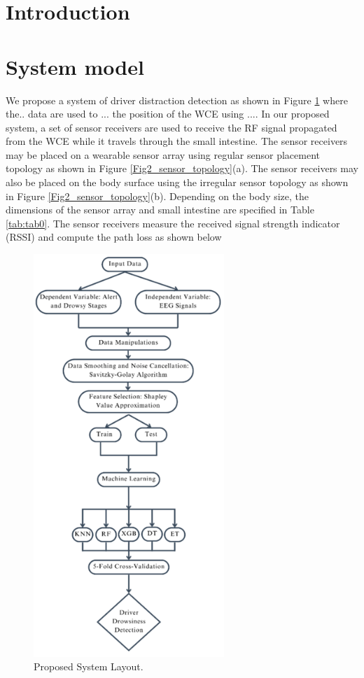 \documentclass{IEEE_lsens}
\begin{document}
\section{Introduction}
\vspace{-0.2cm}

\section{System model}
\vspace{-0.1cm}
We propose a system of driver distraction detection as shown in Figure \ref{Fig_system_layout} where the.. data are used to ... the position of the WCE using .... In our proposed system, a set of sensor receivers are used to receive the RF signal propagated from the WCE while it travels through the small intestine. The sensor receivers may be placed on a wearable sensor array using regular sensor placement topology as shown in Figure \ref{Fig2_sensor_topology}(a). The sensor receivers may also be placed on the body surface using the irregular sensor topology as shown in Figure \ref{Fig2_sensor_topology}(b). Depending on the body size, the dimensions of the sensor array and small intestine are specified in Table \ref{tab:tab0}. The sensor receivers measure the received signal strength indicator (RSSI) and compute the path loss as shown below
\begin{figure}[t!]
\centering
\includegraphics[width=7.2cm,keepaspectratio=true]{Fig_system_layout.png}
\vspace{-0.2cm}
\caption{\scriptsize Proposed System Layout.
\label{Fig_system_layout}}
\vspace{-0.3cm}
\end{figure}
\end{document}
